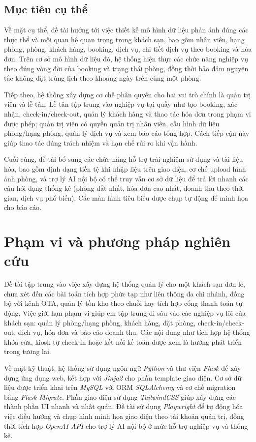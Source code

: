 \documentclass[13pt,a4paper]{extreport}
\begin{document}
\subsection{Mục tiêu cụ thể}

Về mặt cụ thể, đề tài hướng tới việc thiết kế mô hình dữ liệu phản ánh đúng các thực thể và mối quan hệ quan trọng trong khách sạn, bao gồm nhân viên, hạng phòng, phòng, khách hàng, booking, dịch vụ, chi tiết dịch vụ theo booking và hóa đơn. Trên cơ sở mô hình dữ liệu đó, hệ thống hiện thực các chức năng nghiệp vụ theo đúng vòng đời của booking và trạng thái phòng, đồng thời bảo đảm nguyên tắc không đặt trùng lịch theo khoảng ngày trên cùng một phòng.

Tiếp theo, hệ thống xây dựng cơ chế phân quyền cho hai vai trò chính là quản trị viên và lễ tân. Lễ tân tập trung vào nghiệp vụ tại quầy như tạo booking, xác nhận, check-in/check-out, quản lý khách hàng và thao tác hóa đơn trong phạm vi được phép; quản trị viên có quyền quản trị nhân viên, cấu hình dữ liệu phòng/hạng phòng, quản lý dịch vụ và xem báo cáo tổng hợp. Cách tiếp cận này giúp thao tác đúng trách nhiệm và hạn chế rủi ro khi vận hành.

Cuối cùng, đề tài bổ sung các chức năng hỗ trợ trải nghiệm sử dụng và tài liệu hóa, bao gồm định dạng tiền tệ khi nhập liệu trên giao diện, cơ chế upload hình ảnh phòng, và trợ lý AI nội bộ có thể truy vấn cơ sở dữ liệu để trả lời nhanh các câu hỏi dạng thống kê (phòng đắt nhất, hóa đơn cao nhất, doanh thu theo thời gian, dịch vụ phổ biến). Các màn hình tiêu biểu được chụp tự động để minh họa cho báo cáo.

\section{Phạm vi và phương pháp nghiên cứu}

Đề tài tập trung vào việc xây dựng hệ thống quản lý cho một khách sạn đơn lẻ, chưa xét đến các bài toán tích hợp phức tạp như liên thông đa chi nhánh, đồng bộ với kênh OTA, quản lý tồn kho theo chuỗi hay tích hợp cổng thanh toán tự động. Việc giới hạn phạm vi giúp em tập trung đi sâu vào các nghiệp vụ lõi của khách sạn: quản lý phòng/hạng phòng, khách hàng, đặt phòng, check-in/check-out, dịch vụ, hóa đơn và báo cáo doanh thu. Các nội dung như tích hợp hệ thống khóa cửa, kiosk tự check-in hoặc kết nối kế toán được xem là hướng phát triển trong tương lai.

Về mặt kỹ thuật, hệ thống sử dụng ngôn ngữ \emph{Python} và thư viện \emph{Flask} để xây dựng ứng dụng web, kết hợp với \emph{Jinja2} cho phần template giao diện. Cơ sở dữ liệu được triển khai trên \emph{MySQL} với ORM \emph{SQLAlchemy} và cơ chế migration bằng \emph{Flask-Migrate}. Phần giao diện sử dụng \emph{TailwindCSS} giúp xây dựng các thành phần UI nhanh và nhất quán. Đề tài sử dụng \emph{Playwright} để tự động hóa việc điều hướng và chụp hình minh họa giao diện theo tài khoản quản trị, đồng thời tích hợp \emph{OpenAI API} cho trợ lý AI nội bộ ở mức hỗ trợ nghiệp vụ và thống kê.
\end{document}
